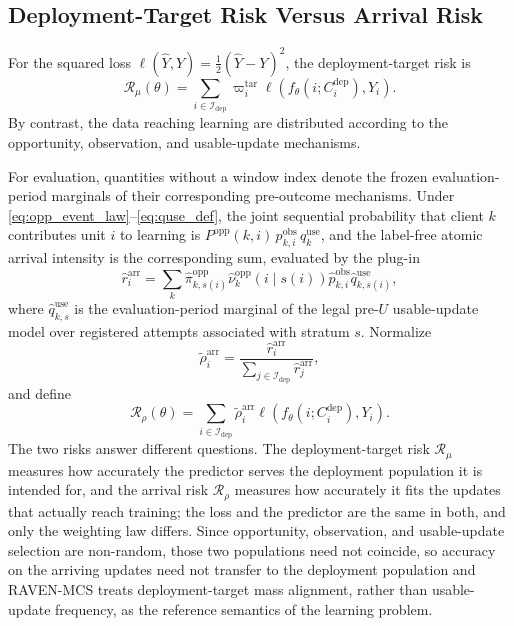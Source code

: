 \documentclass[letterpaper,journal]{IEEEtran}
\begin{document}
\subsection{Deployment-Target Risk Versus Arrival Risk}
\label{subsec:target_risk}

For the squared loss
$\ell(\widehat Y,Y)=\tfrac{1}{2}(\widehat Y-Y)^2$, the deployment-target risk is
\begin{equation}
 \mathcal{R}_{\mu}(\theta)
 =
 \sum_{i\in\mathcal{I}_{\mathrm{dep}}}
 \varpi_i^{\mathrm{tar}}
 \ell\!\left(
 f_{\theta}(i;C_i^{\mathrm{dep}}),Y_i
 \right).
 \label{eq:target_risk}
\end{equation}
By contrast, the data reaching learning are distributed according to the
opportunity, observation, and usable-update mechanisms.

For evaluation, quantities without a window index denote the frozen
evaluation-period marginals of their corresponding pre-outcome mechanisms.
Under \eqref{eq:opp_event_law}--\eqref{eq:quse_def}, the joint sequential
probability that client $k$ contributes unit $i$ to learning is
$P^{\mathrm{opp}}(k,i)\,p^{\mathrm{obs}}_{k,i}\,q^{\mathrm{use}}_{k}$, and the
label-free atomic arrival intensity is the corresponding sum, evaluated by the
plug-in
\begin{equation}
 \widehat r_i^{\mathrm{arr}}
 =
 \sum_k
 \widehat\pi^{\mathrm{opp}}_{k,s(i)}
 \widehat\nu^{\mathrm{opp}}_{k}(i\mid s(i))
 \widehat p^{\mathrm{obs}}_{k,i}
 \widehat q^{\mathrm{use}}_{k,s(i)},
 \label{eq:arrival_intensity}
\end{equation}
where $\widehat q^{\mathrm{use}}_{k,s}$ is the evaluation-period marginal of the
legal pre-$U$ usable-update model over registered attempts associated with
stratum $s$.  Normalize
\begin{equation}
 \widetilde\rho_i^{\mathrm{arr}}
 =
 \frac{\widehat r_i^{\mathrm{arr}}}
 {\sum_{j\in\mathcal{I}_{\mathrm{dep}}}\widehat r_j^{\mathrm{arr}}},
 \label{eq:arrival_distribution}
\end{equation}
and define
\begin{equation}
 \mathcal{R}_{\rho}(\theta)
 =
 \sum_{i\in\mathcal{I}_{\mathrm{dep}}}
 \widetilde\rho_i^{\mathrm{arr}}
 \ell\!\left(
 f_{\theta}(i;C_i^{\mathrm{dep}}),Y_i
 \right).
 \label{eq:arrival_risk}
\end{equation}
The two risks answer different questions.  The deployment-target risk
$\mathcal{R}_{\mu}$ measures how accurately the predictor serves the deployment
population it is intended for, and the arrival risk $\mathcal{R}_{\rho}$ measures
how accurately it fits the updates that actually reach training; the loss and the
predictor are the same in both, and only the weighting law differs.  Since
opportunity, observation, and usable-update selection are non-random, those two
populations need not coincide, so accuracy on the arriving updates need not
transfer to the deployment population and RAVEN-MCS treats deployment-target mass
alignment, rather than usable-update frequency, as the reference semantics of the
learning problem.
\end{document}
